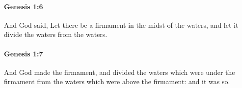 		\paragraph{Genesis 1:6} %
			\label{GENESIS-1-6}

			And God said, Let there be a firmament in the midst of the waters, and let it divide the waters from the waters.


		\paragraph{Genesis 1:7} %
			\label{GENESIS-1-7}

			And God made the firmament, and divided the waters which were under the firmament from the waters which were above the firmament: and it was so.


